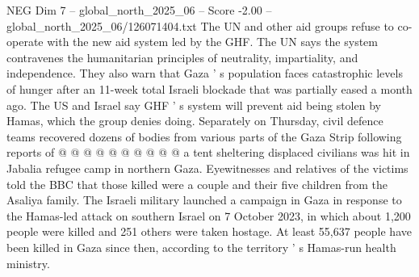 \begin{textsample}{NEG Dim 7 – global\_north\_2025\_06 – Score -2.00 – global\_north\_2025\_06/126071404.txt}
The UN and other aid groups refuse to co-operate with the new aid system led by the GHF.
The UN says the system contravenes the humanitarian principles of neutrality, impartiality, and independence.
They also warn that Gaza ' s population faces catastrophic levels of hunger after an 11-week total Israeli blockade that was partially eased a month ago.
The US and Israel say GHF ' s system will prevent aid being stolen by Hamas, which the group denies doing.
Separately on Thursday, civil defence teams recovered dozens of bodies from various parts of the Gaza Strip following reports of @ @ @ @ @ @ @ @ @ @ a tent sheltering displaced civilians was hit in Jabalia refugee camp in northern Gaza.
Eyewitnesses and relatives of the victims told the BBC that those killed were a couple and their five children from the Asaliya family.
The Israeli military launched a campaign in Gaza in response to the Hamas-led attack on southern Israel on 7 October 2023, in which about 1,200 people were killed and 251 others were taken hostage.
At least 55,637 people have been killed in Gaza since then, according to the territory ' s Hamas-run health ministry.

\end{textsample}
